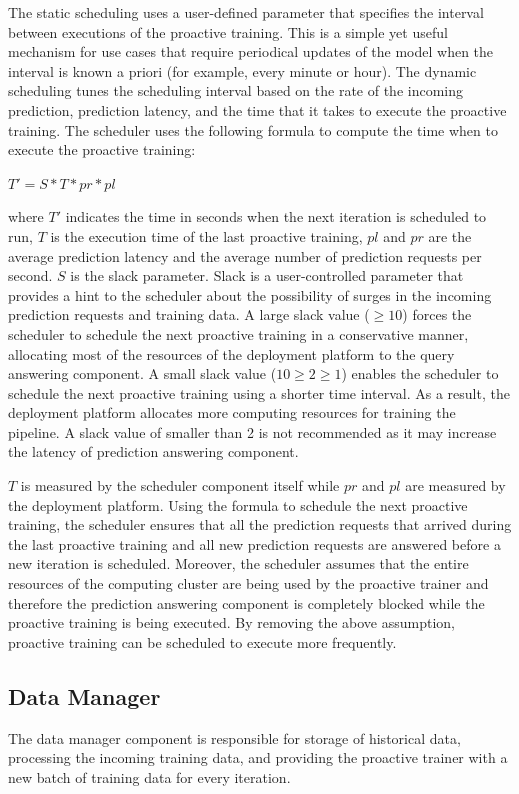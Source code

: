 The static scheduling uses a user-defined parameter that specifies the interval between executions of the proactive training.
This is a simple yet useful mechanism for use cases that require periodical updates of the model when the interval is known a priori (for example, every minute or hour). 
The dynamic scheduling tunes the scheduling interval based on the rate of the incoming prediction, prediction latency, and the time that it takes to execute the proactive training.
The scheduler uses the following formula to compute the time when to execute the proactive training:
\begin{center}
$T' = S * T * pr * pl$
\end{center}
where $T'$ indicates the time in seconds when the next iteration is scheduled to run, $T$ is the execution time of the last proactive training, $pl$ and $pr$ are the average prediction latency and the average number of prediction requests per second.
$S$ is the slack parameter.
Slack is a user-controlled parameter that provides a hint to the scheduler about the possibility of surges in the incoming prediction requests and training data.
A large slack value ($\geq10$) forces the scheduler to schedule the next proactive training in a conservative manner, allocating most of the resources of the deployment platform to the query answering component.
A small slack value ($10\geq2\geq1$) enables the scheduler to schedule the next proactive training using a shorter time interval.
As a result, the deployment platform allocates more computing resources for training the pipeline.
A slack value of smaller than 2 is not recommended as it may increase the latency of prediction answering component.

$T$ is measured by the scheduler component itself while $pr$ and $pl$ are measured by the deployment platform.
Using the formula to schedule the next proactive training, the scheduler ensures that all the prediction requests that arrived during the last proactive training and all new prediction requests are answered before a new iteration is scheduled.
Moreover, the scheduler assumes that the entire resources of the computing cluster are being used by the proactive trainer and therefore the prediction answering component is completely blocked while the proactive training is being executed.
By removing the above assumption, proactive training can be scheduled to execute more frequently.

\subsection{Data Manager} \label{data-manager}
The data manager component is responsible for storage of historical data, processing the incoming training data, and providing the proactive trainer with a new batch of training data for every iteration.

